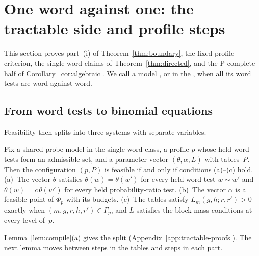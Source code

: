
\section{One word against one: the tractable side and profile steps}\label{sec:tractable}

This section proves part~(i) of Theorem~\ref{thm:boundary}, the
fixed-profile criterion, the single-word claims of
Theorem~\ref{thm:directed}, and the P-complete half of
Corollary~\ref{cor:algebraic}.
We call a model , or in the , when all its word tests are word-against-word.

\subsection{From word tests to binomial equations}\label{sec:compile}

Feasibility then splits into three systems with separate variables.

\begin{lemma}\label{lem:separate}
Fix a shared-probe model in the single-word class, a profile $p$ whose held
word tests form an admissible set, and a parameter vector
$(\theta,\alpha,L)$ with tables~$P$. Then the configuration $(p,P)$ is
feasible if and only if conditions (a)--(c) hold.
(a)~The vector $\theta$ satisfies $\theta(w)=\theta(w')$ for every held
word test $w\sim w'$ and $\theta(w)=c\,\theta(w')$ for every held
probability-ratio test.
(b)~The vector $\alpha$ is a feasible point of $\Phi_p$ with its budgets.
(c)~The tables satisfy $L_m(g,h;r,r')>0$ exactly when
$(m,g,r,h,r')\in\Gamma_p$, and $L$ satisfies the block-mass conditions at
every level of~$p$.
\end{lemma}

Lemma~\ref{lem:compile}(a) gives the split
(Appendix~\ref{app:tractable-proofs}). The next lemma moves between steps in the tables and
steps in each part.

